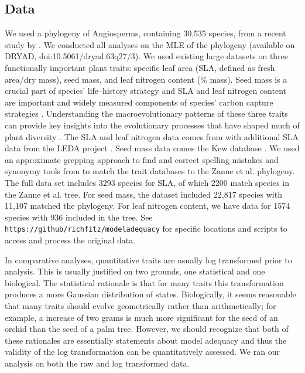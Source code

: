 \documentclass[a4paper,11pt]{article}
\begin{document}
\subsection{Data}
We used a phylogeny of Angiosperms, containing 30,535 species, from a recent study by \citet{Zanne2013}.  We conducted all analyses on the MLE of the phylogeny (available on DRYAD, doi:10.5061/dryad.63q27/3). We used existing large datasets on three functionally important plant traits: specific leaf area (SLA, defined as fresh area/dry mass), seed mass, and leaf nitrogen content (\% mass). Seed mass is a crucial part of species' life--history strategy \citep{Leishman2000, Westoby2002} and SLA and leaf nitrogen content are important and widely measured components of species' carbon capture strategies \citep{Wright2004}. Understanding the macroevolutionary patterns of these three traits can provide key insights into the evolutionary processes that have shaped much of plant diversity \citep{ksi}. The SLA and leaf nitrogen data comes from \citet{Wright2004} with additional SLA data from the LEDA project \citep{Kleyer2008}. Seed mass data comes the Kew database \citep{Kew2008}. We used an approximate grepping approach to find and correct spelling mistakes and synonymy tools from \citet{plantlist} to match the trait databases to the Zanne et al. phylogeny. 
The full data set includes 3293 species for SLA, of which 2200 match species in the Zanne et al. tree. For seed mass, the dataset included 22,817 species with 11,107 matched the phylogeny. For leaf nitrogen content, we have data for 1574 species with 936 included in the tree. 
%
See \texttt{https://github/richfitz/modeladequacy} for specific locations and scripts to access and process the original data. 

In comparative analyses, quantitative traits are usually log transformed prior to analysis. This is usually justified on two grounds, one statistical and one biological. The statistical rationale is that for many traits this transformation produces a more Gaussian distribution of states. Biologically, it seems reasonable that many traits should evolve geometrically rather than arithmetically; 
for example, a increase of two grams is much more significant for the seed of an orchid than the seed of a palm tree. However, we should recognize that both of these rationales are essentially statements about model adequacy and thus the validity of the log transformation can be quantitatively assessed. We ran our analysis on both the raw and log transformed data.
\end{document}

